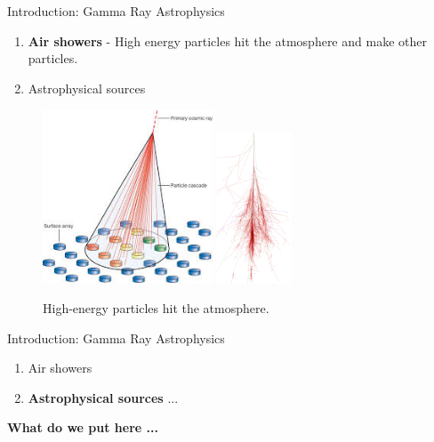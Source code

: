 \documentclass{beamer}
\begin{document}
\begin{frame}{Introduction: Gamma Ray Astrophysics}
\small
\begin{enumerate}
\item \textbf{Air showers} - High energy particles hit the atmosphere and make other particles.
\item Astrophysical sources
\end{enumerate}

\begin{figure}
\centering
\includegraphics[width=0.45\textwidth]{figures/air_shower_1.jpeg}
\includegraphics[width=0.2\textwidth]{figures/air_shower_2.png}
\caption{\label{fig:1} High-energy particles hit the atmosphere.}
\end{figure}
\end{frame}

\begin{frame}{Introduction: Gamma Ray Astrophysics}
\small
\begin{enumerate}
\item Air showers
\item \textbf{Astrophysical sources} ...
\end{enumerate}

\textbf{\alert{What do we put here ...}}

\end{frame}
\end{document}
